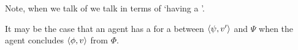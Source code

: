 \begin{note}
  Note, when we talk of  we talk in terms of `having a '.

  It may be the case that an agent has a \wit{} for a \ros{} between \(\langle \psi, v' \rangle\) and \(\Psi\) when the agent concludes \(\langle \phi, v \rangle\) from \(\Phi\).


  \end{note}

\section{\supportII{}}
\label{cha:ros:II}

